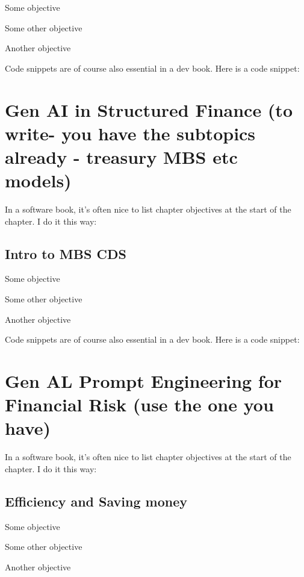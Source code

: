 \documentclass[a4paper,headinclude=on,footinclude=on,12pt,oneside]{scrbook}
\begin{document}
\begin{arrows}
	\item Some objective
	\item Some other objective
	\item Another objective
\end{arrows}


Code snippets are of course also essential in a dev book. Here is a code snippet:



\chapter{Gen AI in Structured Finance (to write- you have the subtopics already - treasury MBS etc models)}
In a software book, it's often nice to list chapter objectives at the start of the chapter. I do it this way:
\section{Intro to MBS CDS}
\begin{arrows}
	\item Some objective
	\item Some other objective
	\item Another objective
\end{arrows}


Code snippets are of course also essential in a dev book. Here is a code snippet:


\chapter{Gen AL Prompt Engineering for Financial Risk (use the one you have)}
In a software book, it's often nice to list chapter objectives at the start of the chapter. I do it this way:
\section{Efficiency and Saving money}
\begin{arrows}
	\item Some objective
	\item Some other objective
	\item Another objective
\end{arrows}
\end{document}
